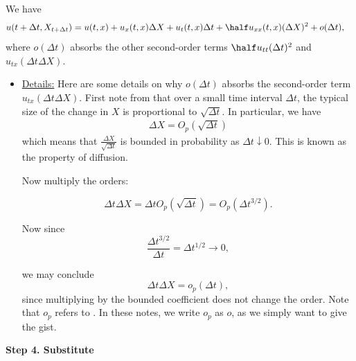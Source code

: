 \documentclass{article} %
\begin{document}
We have 
%
\begin{align*}
u(t+ \Delta t, X_{t+\Delta t}) & = u(t,x)  + u_x(t,x) \Delta X + u_t(t,x) \Delta t + \half u_{xx}(t,x) (\Delta X)^2+ o(\Delta t),  
\end{align*}
%
where $o(\Delta t)$ absorbs the other second-order terms $\half u_{tt}(\Delta t)^2$ and $u_{tx}(\Delta t \Delta X)$. 

\vspace{1cm}

{\footnotesize
\begin{itemize}
\item \underline{Details:} Here are some details on why $o(\Delta t)$ absorbs the second-order term $u_{tx}(\Delta t \Delta X)$. First note from   that over a small time interval 
$\Delta t$, the typical size of the change in $X$ is proportional to $\sqrt{\Delta t}$.  In particular, we have
%
\begin{align}
 \Delta X = O_p(\sqrt{\Delta t}) 
\label{eqn:space_increment_scales_quadratically_in_time_increments}	
\end{align}
%
which means that $\frac{\Delta X}{\sqrt{\Delta t}}$ is bounded in probability as $\Delta t \downarrow 0$. This is known as the  property of diffusion.


Now multiply the orders:

\[ \Delta t \Delta X = \Delta t O_p(\sqrt{\Delta t}) = O_p(\Delta t^{3/2}).\]

Now since
\[ \frac{\Delta t^{3/2}}{\Delta t} = \Delta t^{1/2} \to 0, \]

we may conclude
\[ \Delta t \Delta X =o_p(\Delta t), \]
since multiplying by the bounded coefficient does not change the order.  Note that $o_p$ refers to .  In these notes, we write $o_p$ as $o$, as we simply want to give the gist.
\end{itemize}
}

\textbf{Step 4. Substitute}
\end{document}
